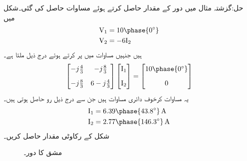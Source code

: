 حل:گزشتہ مثال میں دور کے  مقدار حاصل کرتے ہوئے مساوات   حاصل کی گئی۔شکل  میں 
\begin{align*}
\bV_1&=10\phase{0^{\circ}}\\
\bV_2&=-6\bI_2
\end{align*}
ہیں جنہیں مساوات    میں پر کرتے ہوئے درج ذیل ملتا ہے۔
\begin{align*}
\begin{bmatrix}
-j\frac{4}{3} & -j\frac{8}{3}\\[2ex]
-j\frac{8}{3} & 6-j\frac{4}{3}
\end{bmatrix}
\begin{bmatrix}
\bI_1\\[2ex]
\bI_2
\end{bmatrix}
=
\begin{bmatrix}
10\phase{0^{\circ}}\\[2ex]
0
\end{bmatrix}
\end{align*}
یہ مساوات کرخوف دائری مساوات ہیں جن سے درج ذیل رو حاصل ہوتی ہیں۔
\begin{align*}
\bI_1&=6.39\phase{43.8^{\circ}} \, \si{\ampere}\\
\bI_2&=2.77\phase{146.3^{\circ}}\, \si{\ampere}
\end{align*}
شکل  کے  رکاوٹی مقدار  حاصل کریں۔
\begin{figure}
\centering
{}
\caption{مشق  کا دور۔}
\label{شکل_نمونہ_پائے_پ}
\end{figure}

